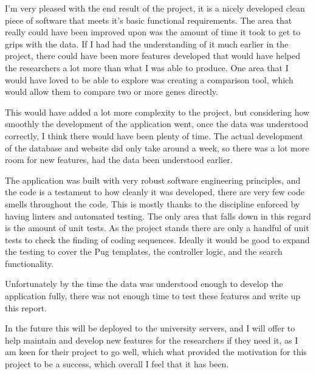 
I'm very pleased with the end result of the project, it is a nicely developed clean piece of software that meets it's basic functional requirements. The area that really could have been improved upon was the amount of time it took to get to grips with the data. If I had had the understanding of it much earlier in the project, there could have been more features developed that would have helped the researchers a lot more than what I was able to produce. One area that I would have loved to be able to explore was creating a comparison tool, which would allow them to compare two or more genes directly. 

This would have added a lot more complexity to the project, but considering how smoothly the development of the application went, once the data was understood correctly, I think there would have been plenty of time. The actual development of the database and website did only take around a week, so there was a lot more room for new features, had the data been understood earlier. 


The application was built with very robust software engineering principles, and the code is a testament to how cleanly it was developed, there are very few code smells\cite{smells} throughout the code. This is mostly thanks to the discipline enforced by having linters and automated testing. The only area that falls down in this regard is the amount of unit tests. As the project stands there are only a handful of unit tests to check the finding of coding sequences. Ideally it would be good to expand the testing to cover the Pug templates, the controller logic, and the search functionality. 

Unfortunately by the time the data was understood enough to develop the application fully, there was not enough time to test these features and write up this report. 

In the future this will be deployed to the university servers, and I will offer to help maintain and develop new features for the researchers if they need it, as I am keen for their project to go well, which what provided the motivation for this project to be a success, which overall I feel that it has been. 
